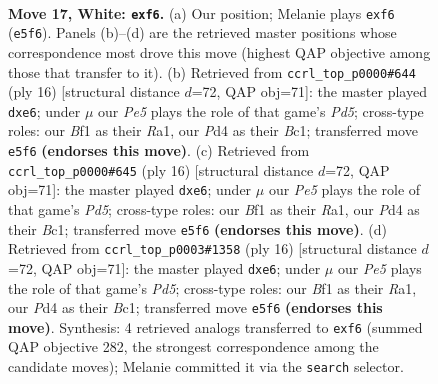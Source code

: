 \documentclass[11pt]{article}
\begin{document}
\clearpage

\begin{figure}[p]\centering
\begin{subfigure}{0.46\textwidth}\centering
\resizebox{\linewidth}{!}{%
\newchessgame
\chessboard[
  setfen={r1bq1rk1/1p1n2pp/n1p1pp2/p2pP3/3P1P2/2N2N2/PPP2KPP/2RQ1B1R w - - 0 17},
  showmover=false,
  pgfstyle=straightmove, color=movearrow, markmove={e5-f6}
]}
\caption{}
\end{subfigure}\hfill
\begin{subfigure}{0.46\textwidth}\centering
\resizebox{\linewidth}{!}{%
\newchessgame
\chessboard[
  setfen={rnbq1rk1/pp4bp/2pp1np1/3Ppp2/2P5/2N2NP1/PP2PPBP/R1BQ1RK1 w - e6 0 9},
  showmover=false,
  pgfstyle=straightmove, color=movearrow, markmove={d5-e6}
]}
\caption{}
\end{subfigure}
\\[4pt]
\begin{subfigure}{0.46\textwidth}\centering
\resizebox{\linewidth}{!}{%
\newchessgame
\chessboard[
  setfen={rnbq1rk1/pp4bp/2pp1np1/3Ppp2/2P5/2N2NP1/PP2PPBP/R1BQ1RK1 w - e6 0 9},
  showmover=false,
  pgfstyle=straightmove, color=movearrow, markmove={d5-e6}
]}
\caption{}
\end{subfigure}\hfill
\begin{subfigure}{0.46\textwidth}\centering
\resizebox{\linewidth}{!}{%
\newchessgame
\chessboard[
  setfen={rnbq1rk1/pp4bp/2pp1np1/3Ppp2/2P5/2N2NP1/PP2PPBP/R1BQ1RK1 w - e6 0 9},
  showmover=false,
  pgfstyle=straightmove, color=movearrow, markmove={d5-e6}
]}
\caption{}
\end{subfigure}
\caption{\textbf{Move 17, White: \texttt{exf6}.} (a) Our position; Melanie plays \texttt{exf6} (\texttt{e5f6}). Panels (b)--(d) are the retrieved master positions whose correspondence most drove this move (highest QAP objective among those that transfer to it). (b) Retrieved from \texttt{ccrl\_top\_p0000\#644} (ply 16) [structural distance $d$=72, QAP obj=71]: the master played \texttt{dxe6}; under $\mu$ our \emph{Pe5} plays the role of that game's \emph{Pd5}; cross-type roles: our \emph{B}f1 as their \emph{R}a1, our \emph{P}d4 as their \emph{B}c1; transferred move \texttt{e5f6} \textbf{(endorses this move)}. (c) Retrieved from \texttt{ccrl\_top\_p0000\#645} (ply 16) [structural distance $d$=72, QAP obj=71]: the master played \texttt{dxe6}; under $\mu$ our \emph{Pe5} plays the role of that game's \emph{Pd5}; cross-type roles: our \emph{B}f1 as their \emph{R}a1, our \emph{P}d4 as their \emph{B}c1; transferred move \texttt{e5f6} \textbf{(endorses this move)}. (d) Retrieved from \texttt{ccrl\_top\_p0003\#1358} (ply 16) [structural distance $d$=72, QAP obj=71]: the master played \texttt{dxe6}; under $\mu$ our \emph{Pe5} plays the role of that game's \emph{Pd5}; cross-type roles: our \emph{B}f1 as their \emph{R}a1, our \emph{P}d4 as their \emph{B}c1; transferred move \texttt{e5f6} \textbf{(endorses this move)}. Synthesis: 4 retrieved analogs transferred to \texttt{exf6} (summed QAP objective 282, the strongest correspondence among the candidate moves); Melanie committed it via the \texttt{search} selector.}
\label{fig:thought-m32}
\end{figure}
\end{document}
